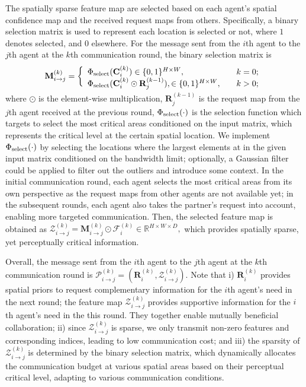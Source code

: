 \documentclass{article}
\begin{document}
The spatially sparse feature map are selected based on each agent's spatial confidence map and the received request maps from others. Specifically, a binary selection matrix is used to represent each location is selected or not, where $1$ denotes selected, and $0$ elsewhere. For the message sent from the $i$th agent to the $j$th agent at the $k$th communication round, the binary selection matrix is
\begin{equation}
\vspace{-1mm}
\label{eq:selector}
\mathbf{M}_{i\rightarrow j}^{(k)}=\left\{
\begin{array}{lll}
\Phi_{\rm select}(\mathbf{C}_{i}^{(k)})\in \{0, 1\}^{H\times W}, &\quad k=0;\\
\Phi_{\rm select}(\mathbf{C}_{i}^{(k)}\odot \mathbf{R}_j^{(k-1)} ), \in \{0, 1\}^{H\times W},  &\quad k>0;
\vspace{-1mm}
\end{array} \right.
\end{equation}
where $\odot$ is the element-wise multiplication, $\mathbf{R}_j^{(k-1)}$ is the request map from the $j$th agent received at the previous round, $\Phi_{\rm select}(\cdot)$ is the selection function which targets to select the most critical areas conditioned on the input matrix, which represents the critical level at the certain spatial location. We implement $\Phi_{\rm select}(\cdot)$ by selecting the locations where the largest elements at in the given input matrix conditioned on the bandwidth limit; optionally, a Gaussian filter could be applied to filter out the outliers and introduce some context. In the initial communication round, each agent selects the most critical areas from its own perspective as the request maps from other agents are not available yet; in the subsequent rounds, each agent also takes the partner's request into account, enabling more targeted communication. Then, the selected feature map is obtained as
$
    \mathcal{Z}_{i\rightarrow j}^{(k)}=\mathbf{M}_{i\rightarrow j}^{(k)}\odot \mathcal{F}_i^{(k)} \in \mathbb{R}^{H\times W \times D},
$
which provides spatially sparse, yet perceptually critical information. 

Overall, the message sent from the $i$th agent to the $j$th agent at the $k$th communication round is $\mathcal{P}_{i\rightarrow j}^{(k)}=(\mathbf{R}_{i}^{(k)}, \mathcal{Z}_{i\rightarrow j}^{(k)} )$. Note that i) $\mathbf{R}_{i}^{(k)}$ provides spatial priors to request complementary information for the $i$th agent's need in the next round; the feature map $ \mathcal{Z}_{i\rightarrow j}^{(k)}$ provides supportive information for the $i$th agent's need in the this round. They together enable mutually beneficial collaboration; ii) since  $\mathcal{Z}_{i\rightarrow j}^{(k)}$ is sparse, we only transmit non-zero features and corresponding indices, leading to low communication cost; and iii) the sparsity of $\mathcal{Z}_{i\rightarrow j}^{(k)}$ is determined by the binary selection matrix, which dynamically allocates the communication budget at various spatial areas based on their perceptual critical level, adapting to various communication conditions. 
\end{document}

